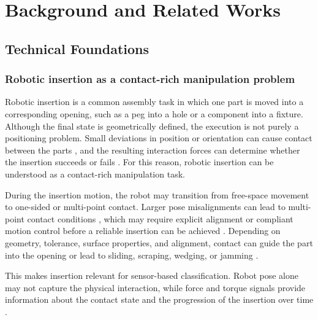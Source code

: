 \chapter{Background and Related Works} \label{ch:state-of-the-art}

\section{Technical Foundations}\label{sec:tech_foundations}

\subsection{Robotic insertion as a contact-rich manipulation problem}

Robotic insertion is a common assembly task in which one part is moved into a corresponding opening, such as a peg into a hole or a component into a fixture. Although the final state is geometrically defined, the execution is not purely a positioning problem. Small deviations in position or orientation can cause contact between the parts \cite{qiaoRoboticPegHoleInsertion1993,xuCompareContactModelbased2019}, and the resulting interaction forces can determine whether the insertion succeeds or fails \cite{raibertHybridPositionForce1981,zhaoPeginHoleAssemblyBased2020}. For this reason, robotic insertion can be understood as a contact-rich manipulation task.

During the insertion motion, the robot may transition from free-space movement to one-sided or multi-point contact. Larger pose misalignments can lead to multi-point contact conditions \cite{tangAutonomousAlignmentPeg2016}, which may require explicit alignment or compliant motion control before a reliable insertion can be achieved \cite{raibertHybridPositionForce1981,xuCompareContactModelbased2019}. Depending on geometry, tolerance, surface properties, and alignment, contact can guide the part into the opening or lead to sliding, scraping, wedging, or jamming \cite{tangAutonomousAlignmentPeg2016,feiContactJammingAnalysis2004b,beltran-hernandezLearningForceControl2020}.

This makes insertion relevant for sensor-based classification. Robot pose alone may not capture the physical interaction, while force and torque signals provide information about the contact state and the progression of the insertion over time \cite{qiaoRoboticPegHoleInsertion1993,jasimContactstateMonitoringForceguided2014,magistrisExperimentalForceTorqueDataset2018}.

